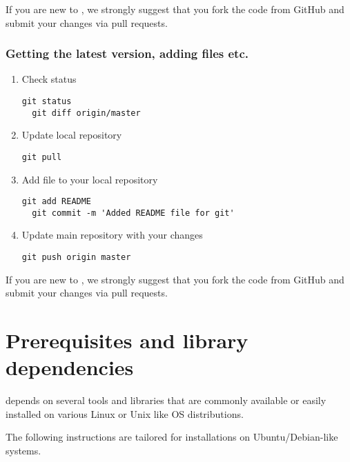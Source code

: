 \documentclass[11pt,fleqn]{book} %
\begin{document}
\begin{WarningBox}
If you are new to \GranularSim, we strongly suggest that you fork the code from GitHub and submit 
your changes via pull requests.
\end{WarningBox}

\subsection{Getting the latest version, adding files etc.}
\begin{enumerate}
  \item Check status
\begin{lstlisting}[backgroundcolor=\color{background}]
  git status
  git diff origin/master
\end{lstlisting}

  \item Update local repository
\begin{lstlisting}[backgroundcolor=\color{background}]
  git pull
\end{lstlisting}

  \item Add file to your local repository
\begin{lstlisting}[backgroundcolor=\color{background}]
  git add README
  git commit -m 'Added README file for git'
\end{lstlisting}

  \item Update main repository with your changes
\begin{lstlisting}[backgroundcolor=\color{background}]
  git push origin master
\end{lstlisting}
\end{enumerate}

\begin{WarningBox}
If you are new to \GranularSim, we strongly suggest that you fork the code from GitHub and submit 
your changes via pull requests.
\end{WarningBox}

\chapter{Prerequisites and library dependencies}
\GranularSim depends on several tools and libraries that are
commonly available or easily installed on various Linux or Unix like
OS distributions.  

\begin{WarningBox}
The following instructions are tailored for installations on Ubuntu/Debian-like systems.
\end{WarningBox}
\end{document}
